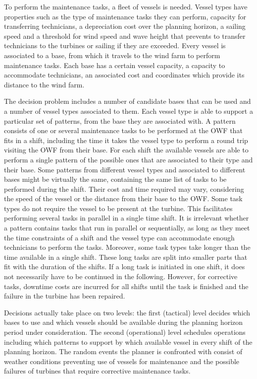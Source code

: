 To perform the maintenance tasks, a fleet of vessels is needed. Vessel types have properties such as the type of maintenance tasks they can perform, capacity for transferring technicians, a depreciation cost over the planning horizon, a sailing speed and a threshold for wind speed and wave height that prevents to transfer technicians to the turbines or sailing if they are exceeded. Every vessel is associated to a base, from which it travels to the wind farm to perform maintenance tasks. Each base has a certain vessel capacity, a capacity to accommodate technicians, an associated cost and coordinates which provide its distance to the wind farm.

The decision problem includes a number of candidate bases that can be used and a number of vessel types associated to them. Each vessel type is able to support a particular set of patterns, from the base they are associated with. A pattern consists of one or several maintenance tasks to be performed at the OWF that fits in a shift, including the time it takes the vessel type to perform a round trip visiting the OWF from their base. For each shift the available vessels are able to perform a single pattern of the possible ones that are associated to their type and their base. Some patterns from different vessel types and associated to different bases might be virtually the same, containing the same list of tasks to be performed during the shift. Their cost and time required may vary, considering the speed of the vessel or the distance from their base to the OWF.  Some task types do not require the vessel to be present at the turbine. This facilitates performing several tasks in parallel in a single time shift. It is irrelevant whether  a pattern contains tasks that run in parallel or sequentially, as long as they meet the time constraints of a shift and the vessel type can accommodate enough technicians to perform the tasks. Moreover, some task types take longer than the time available in a single shift. These long tasks are split into smaller parts that fit with the duration of the shifts. If a long task is initiated in one shift, it does not necessarily have to be continued in the following. However, for corrective tasks, downtime costs are incurred for all shifts until the task is finished and the failure in the turbine has been repaired.

Decisions actually take place on two levels: the first (tactical) level decides which bases to use and which vessels should be available during the planning horizon period under consideration. The second (operational) level schedules operations  including which patterns to support by which available vessel in every shift of the planning horizon. The random events the planner is confronted with consist of weather conditions preventing use of vessels for maintenance and the possible failures of turbines that require corrective maintenance tasks.



